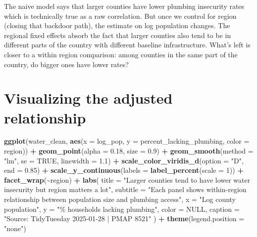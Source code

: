 \documentclass[
]{article}
\newenvironment{Shaded}{\begin{snugshade}}{\end{snugshade}}
\newcommand{\AttributeTok}[1]{\textcolor[rgb]{0.13,0.29,0.53}{#1}}
\newcommand{\ConstantTok}[1]{\textcolor[rgb]{0.56,0.35,0.01}{#1}}
\newcommand{\DecValTok}[1]{\textcolor[rgb]{0.00,0.00,0.81}{#1}}
\newcommand{\FloatTok}[1]{\textcolor[rgb]{0.00,0.00,0.81}{#1}}
\newcommand{\FunctionTok}[1]{\textcolor[rgb]{0.13,0.29,0.53}{\textbf{#1}}}
\newcommand{\NormalTok}[1]{#1}
\newcommand{\SpecialCharTok}[1]{\textcolor[rgb]{0.81,0.36,0.00}{\textbf{#1}}}
\newcommand{\StringTok}[1]{\textcolor[rgb]{0.31,0.60,0.02}{#1}}
\begin{document}
The naive model says that larger counties have lower plumbing insecurity
rates which is technically true as a raw correlation. But once we
control for region (closing that backdoor path), the estimate on log
population changes. The regional fixed effects absorb the fact that
larger counties also tend to be in different parts of the country with
different baseline infrastructure. What's left is closer to a within
region comparison: among counties in the same part of the country, do
bigger ones have lower rates?

\section{Visualizing the adjusted
relationship}\label{visualizing-the-adjusted-relationship}

\begin{Shaded}
\begin{Highlighting}[]
\FunctionTok{ggplot}\NormalTok{(water\_clean, }\FunctionTok{aes}\NormalTok{(}\AttributeTok{x =}\NormalTok{ log\_pop, }\AttributeTok{y =}\NormalTok{ percent\_lacking\_plumbing, }\AttributeTok{color =}\NormalTok{ region)) }\SpecialCharTok{+}
  \FunctionTok{geom\_point}\NormalTok{(}\AttributeTok{alpha =} \FloatTok{0.18}\NormalTok{, }\AttributeTok{size =} \FloatTok{0.9}\NormalTok{) }\SpecialCharTok{+}
  \FunctionTok{geom\_smooth}\NormalTok{(}\AttributeTok{method =} \StringTok{"lm"}\NormalTok{, }\AttributeTok{se =} \ConstantTok{TRUE}\NormalTok{, }\AttributeTok{linewidth =} \FloatTok{1.1}\NormalTok{) }\SpecialCharTok{+}
  \FunctionTok{scale\_color\_viridis\_d}\NormalTok{(}\AttributeTok{option =} \StringTok{"D"}\NormalTok{, }\AttributeTok{end =} \FloatTok{0.85}\NormalTok{) }\SpecialCharTok{+}
  \FunctionTok{scale\_y\_continuous}\NormalTok{(}\AttributeTok{labels =} \FunctionTok{label\_percent}\NormalTok{(}\AttributeTok{scale =} \DecValTok{1}\NormalTok{)) }\SpecialCharTok{+}
  \FunctionTok{facet\_wrap}\NormalTok{(}\SpecialCharTok{\textasciitilde{}}\NormalTok{region) }\SpecialCharTok{+}
  \FunctionTok{labs}\NormalTok{(}
    \AttributeTok{title    =} \StringTok{"Larger counties tend to have lower water insecurity but region matters a lot"}\NormalTok{,}
    \AttributeTok{subtitle =} \StringTok{"Each panel shows within{-}region relationship between population size and plumbing access"}\NormalTok{,}
    \AttributeTok{x        =} \StringTok{"Log county population"}\NormalTok{,}
    \AttributeTok{y        =} \StringTok{"\% households lacking plumbing"}\NormalTok{,}
    \AttributeTok{color    =} \ConstantTok{NULL}\NormalTok{,}
    \AttributeTok{caption  =} \StringTok{"Source: TidyTuesday 2025{-}01{-}28 | PMAP 8521"}
\NormalTok{  ) }\SpecialCharTok{+}
  \FunctionTok{theme}\NormalTok{(}\AttributeTok{legend.position =} \StringTok{"none"}\NormalTok{)}
\end{Highlighting}
\end{Shaded}
\end{document}

